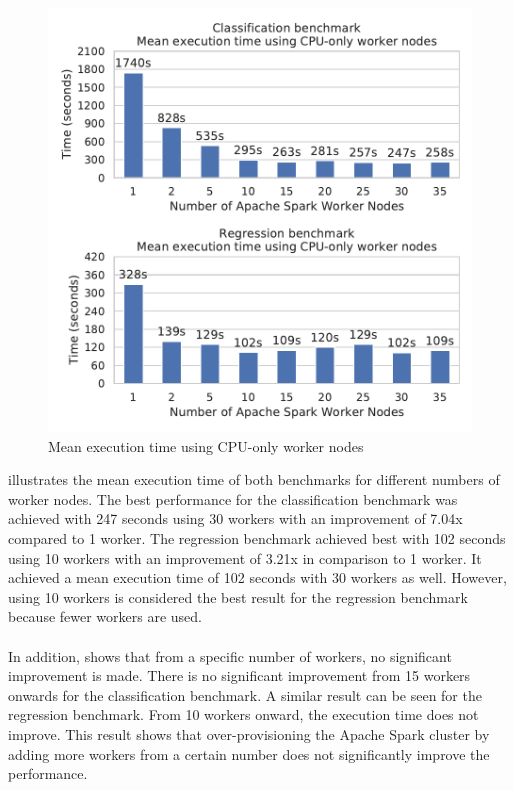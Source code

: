 \begin{figure}[h]
\centering
\includegraphics[scale=0.9]{images/07_evaluation/overall_cpu}
\caption{Mean execution time using CPU-only worker nodes}
\label{fig:07_static_results}
\end{figure}
 illustrates the mean execution time of both benchmarks for different numbers of worker nodes.
The best performance for the classification benchmark was achieved with 247 seconds using 30 workers with an improvement of 7.04x compared to 1 worker.
The regression benchmark achieved best with 102 seconds using 10 workers with an improvement of 3.21x in comparison to 1 worker. It achieved a mean execution time of 102 seconds with 30 workers as well. However, using 10 workers is considered the best result for the regression benchmark because fewer workers are used.

\paragraph{}
In addition,  shows that from a specific number of workers, no significant improvement is made.
There is no significant improvement from 15 workers onwards for the classification benchmark.
A similar result can be seen for the regression benchmark. From 10 workers onward, the execution time does not improve.
This result shows that over-provisioning the Apache Spark cluster by adding more workers from a certain number does not significantly improve the performance.


